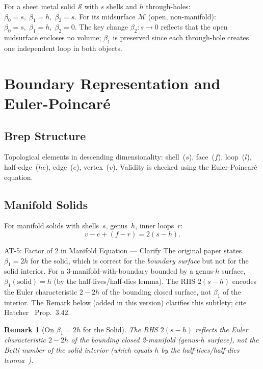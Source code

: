 \documentclass[journal,twocolumn,10pt]{IEEEtran}
\newtheorem{remark}[theorem]{Remark}
\newcommand{\Betti}[1]{\beta_{#1}}
\begin{document}
For a sheet metal solid $\mathcal{S}$ with $s$ shells and $h$ through-holes:
$\Betti{0}=s,\;\Betti{1}=h,\;\Betti{2}=s$.
For its midsurface $\mathcal{M}$ (open, non-manifold):
$\Betti{0}=s,\;\Betti{1}=h,\;\Betti{2}=0$.
The key change $\Betti{2}:s\to0$ reflects that the open midsurface encloses
no volume; $\Betti{1}$ is preserved since each through-hole creates one
independent loop in both objects.

\section{Boundary Representation and Euler-Poincar\'e}\label{sec:prelim}

\subsection{Brep Structure}

Topological elements in descending dimensionality: shell~($s$), face~($f$),
loop~($l$), half-edge~($he$), edge~($e$), vertex~($v$). Validity is checked
using the Euler-Poincar\'e equation.

\subsection{Manifold Solids}

For manifold solids with shells~$s$, genus~$h$, inner loops~$r$:
\begin{equation}
  v - e + (f-r) = 2(s-h). \label{eqn:manifold}
\end{equation}

\begin{atblock}{AT-5: Factor of 2 in Manifold Equation --- Clarify}
The original paper states $\Betti{1}=2h$ for the solid, which is correct for
the \emph{boundary surface} but not for the solid interior. For a
3-manifold-with-boundary bounded by a genus-$h$ surface, $\Betti{1}(\text{solid})=h$
(by the half-lives/half-dies lemma). The RHS $2(s-h)$ encodes the Euler
characteristic $2-2h$ of the bounding closed surface, not $\Betti{1}$ of the
interior. The Remark below (added in this version) clarifies this subtlety;
cite Hatcher~\cite{Hatcher2002} Prop.~3.42.
\end{atblock}

\begin{remark}[On $\Betti{1}=2h$ for the Solid]\label{rem:betti1solid}
The RHS $2(s-h)$ reflects the Euler characteristic $2-2h$ of the bounding
closed 2-manifold (genus-$h$ surface), not the Betti number of the solid
interior (which equals $h$ by the half-lives/half-dies
lemma~\cite{Hatcher2002}).
\end{remark}
\end{document}
